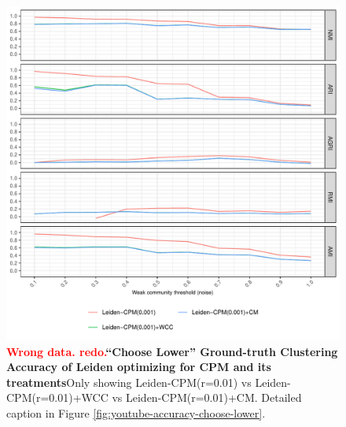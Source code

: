 \documentclass[aps,pre,superscriptaddress]{revtex4}
\begin{document}
\begin{figure}[!htpb]
\centering
\includegraphics[]{figures/choose_lower_youtube_leiden_cpm_accuracy.pdf}
\caption[]{\textbf{\textcolor{red}{Wrong data. redo.}``Choose Lower'' Ground-truth Clustering Accuracy of Leiden optimizing for CPM and its treatments}Only showing Leiden-CPM(r=0.01) vs Leiden-CPM(r=0.01)+WCC vs Leiden-CPM(r=0.01)+CM. Detailed caption in Figure \ref{fig:youtube-accuracy-choose-lower}.}
\label{fig:choose-lower-leiden-cpm}
\end{figure}
\end{document}

